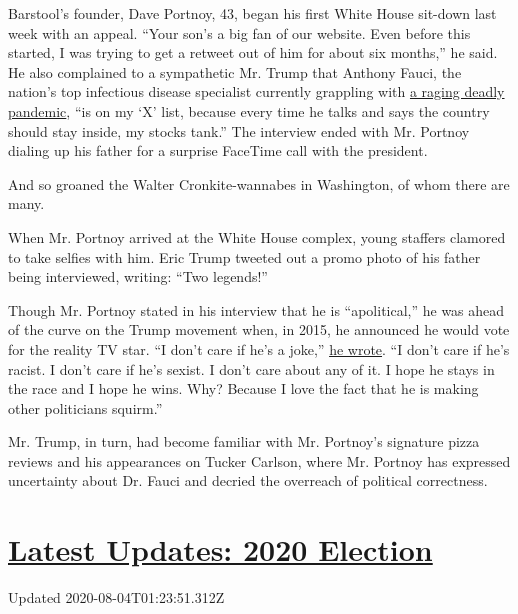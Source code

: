 Barstool's founder, Dave Portnoy, 43, began his first White House
sit-down last week with an appeal. ``Your son's a big fan of our
website. Even before this started, I was trying to get a retweet out of
him for about six months,'' he said. He also complained to a sympathetic
Mr. Trump that Anthony Fauci, the nation's top infectious disease
specialist currently grappling with
\href{https://www.nytimes.com/interactive/2020/us/coronavirus-us-cases.html}{a
raging deadly pandemic}, ``is on my `X' list, because every time he
talks and says the country should stay inside, my stocks tank.'' The
interview ended with Mr. Portnoy dialing up his father for a surprise
FaceTime call with the president.

And so groaned the Walter Cronkite-wannabes in Washington, of whom there
are many.

When Mr. Portnoy arrived at the White House complex, young staffers
clamored to take selfies with him. Eric Trump tweeted out a promo photo
of his father being interviewed, writing: ``Two legends!''

Though Mr. Portnoy stated in his interview that he is ``apolitical,'' he
was ahead of the curve on the Trump movement when, in 2015, he announced
he would vote for the reality TV star. ``I don't care if he's a joke,''
\href{https://www.barstoolsports.com/blog/351804/im-officially-voting-for-donald-trump}{he
wrote}. ``I don't care if he's racist. I don't care if he's sexist. I
don't care about any of it. I hope he stays in the race and I hope he
wins. Why? Because I love the fact that he is making other politicians
squirm.''

Mr. Trump, in turn, had become familiar with Mr. Portnoy's signature
pizza reviews and his appearances on Tucker Carlson, where Mr. Portnoy
has expressed uncertainty about Dr. Fauci and decried the overreach of
political correctness.

\hypertarget{latest-updates-2020-election}{%
\section{\texorpdfstring{\href{https://www.nytimes.com/2020/08/03/us/elections/biden-vs-trump.html?action=click\&pgtype=Article\&state=default\&region=MAIN_CONTENT_1\&context=storylines_live_updates}{Latest
Updates: 2020
Election}}{Latest Updates: 2020 Election}}\label{latest-updates-2020-election}}

Updated 2020-08-04T01:23:51.312Z

